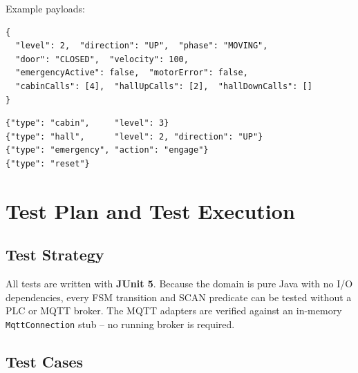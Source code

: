 \documentclass[12pt,a4paper]{article}
\begin{document}
\clearpage
Example payloads:

\begin{lstlisting}[language={}, caption={Status message (control to HMI)},
  basicstyle=\ttfamily\footnotesize, xleftmargin=0pt, framexleftmargin=0pt,
  numbers=none]
{
  "level": 2,  "direction": "UP",  "phase": "MOVING",
  "door": "CLOSED",  "velocity": 100,
  "emergencyActive": false,  "motorError": false,
  "cabinCalls": [4],  "hallUpCalls": [2],  "hallDownCalls": []
}
\end{lstlisting}

\begin{lstlisting}[language={}, caption={Command messages (HMI to control)},
  basicstyle=\ttfamily\footnotesize, xleftmargin=0pt, framexleftmargin=0pt,
  numbers=none]
{"type": "cabin",     "level": 3}
{"type": "hall",      "level": 2, "direction": "UP"}
{"type": "emergency", "action": "engage"}
{"type": "reset"}
\end{lstlisting}

\section{Test Plan and Test Execution}

\subsection{Test Strategy}

All tests are written with \textbf{JUnit 5}. Because the domain is pure Java
with no I/O dependencies, every FSM transition and SCAN predicate can be tested
without a PLC or MQTT broker. The MQTT adapters are verified against an
in-memory \texttt{MqttConnection} stub -- no running broker is required.

\subsection{Test Cases}
\end{document}
